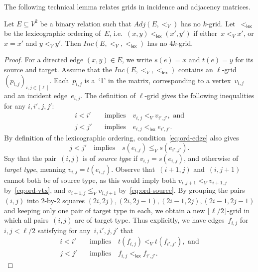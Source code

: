 \documentclass[a4paper,UKenglish,cleveref,thm-restate]{lipics-v2021}
\theoremstyle{remark}
\newcommand{\lex}{\mathsf{lex}}
\newcommand{\adj}{Adj}
\newcommand{\inc}{Inc}
\newcommand{\floor}[1]{\lfloor #1 \rfloor}
\begin{document}
The following technical lemma relates grids in incidence and adjacency matrices.
\begin{lemma}\label{lem:incidence-matrix-grid}
    Let $E \subseteq V^2$ be a binary relation such that $\adj(E,<_V)$ has no $k$-grid.
    Let~$<_\lex$ be the lexicographic ordering of~$E$, i.e.\ $(x,y) <_\lex (x',y')$ if either~$x <_V x'$, or $x = x'$ and $y <_V y'$.
    Then $\inc(E,<_V,<_\lex)$ has no $4k$-grid.
\end{lemma}
\begin{proof}
    For a directed edge $(x,y) \in E$, we write $s(e) = x$ and $t(e) = y$ for its source and target.
    Assume that the $Inc(E,<_V,<_\lex)$ contains an $\ell$-grid $(p_{i,j})_{i,j \in [\ell]}$.
    Each~$p_{i,j}$ is a~`1' in the matrix, corresponding to a vertex~$v_{i,j}$ and an incident edge~$e_{i,j}$. The definition of $\ell$-grid gives the following inequalities for any $i,i',j,j'$:
    \begin{align}
        \label{eq:ord-vtx} i<i' \quad & \text{implies} \quad v_{i,j} <_V v_{i',j'}, \text{ and}  \\
        \label{eq:ord-edge} j<j' \quad & \text{implies} \quad e_{i,j} <_\lex e_{i',j'}.
    \end{align}
    By definition of the lexicographic ordering, condition~\eqref{eq:ord-edge} also gives 
    \begin{equation}
        \label{eq:ord-source}
        j<j' \quad \text{implies} \quad s(e_{i,j}) \le_V s(e_{i',j'}).
    \end{equation}
    Say that the pair~$(i,j)$ is of \emph{source type} if $v_{i,j} = s(e_{i,j})$, and otherwise of \emph{target type}, meaning $v_{i,j} = t(e_{i,j})$.
    Observe that~$(i+1,j)$ and~$(i,j+1)$ cannot both be of source type, as this would imply both $v_{i,j+1} <_V v_{i+1,j}$ by~\eqref{eq:ord-vtx}, and $v_{i+1,j} \le_V v_{i,j+1}$ by~\eqref{eq:ord-source}.
    By grouping the pairs~$(i,j)$ into $2$-by-$2$ squares $(2i,2j),(2i,2j-1),(2i-1,2j),(2i-1,2j-1)$
    and keeping only one pair of target type in each, we obtain a new $\floor{\ell/2}$-grid in which all pairs~$(i,j)$ are of target type.
    Thus explicitly, we have edges~$f_{i,j}$ for~$i,j < \ell/2$ satisfying for any~$i,i',j,j'$ that
    \begin{align}
        \label{eq:ord-tgt} i<i' \quad & \text{implies} \quad t(f_{i,j}) <_V t(f_{i',j'}), \text{ and}  \\
        \label{eq:ord-edge2} j<j' \quad & \text{implies} \quad f_{i,j} <_\lex f_{i',j'}.
    \end{align}

\end{proof}
\end{document}
